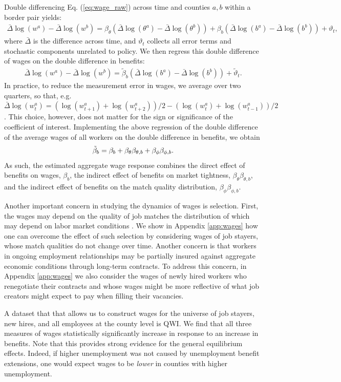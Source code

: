 \documentclass[12pt]{article}
\newcommand{\1}{\mathbf{1}}
\newcommand{\beq}{\begin{eqnarray}}
\newcommand{\eeq}{\end{eqnarray}}
\begin{document}
Double differencing Eq. (\ref{eq:wage_raw}) across time and counties $a,b$ within a border pair yields:
\beq \label{eq:wage_thetab}
\bar{\Delta} \log(w^a) - \bar{\Delta} \log(w^b)
=  \beta_{\theta} (\bar{\Delta} \log(\theta^a) - \bar{\Delta}\log(\theta^b))
+ \beta_b (\bar{\Delta}\log(b^a) - \bar{\Delta}\log(b^b)) + \vartheta_t,
\eeq
where $\bar{\Delta}$ is the difference across time, and $\vartheta_t$ collects all error terms and stochastic components unrelated to policy. We then regress this double difference of wages on the double difference in benefits:
\beq \label{eq:wageequation_estimate}
\bar{\Delta}\log(w^a) - \bar{\Delta}\log(w^b)
=\tilde{\beta}_b (\bar{\Delta}\log(b^a) - \bar{\Delta}\log(b^b)) + \tilde{\vartheta}_t.
\eeq
In practice, to reduce the measurement error in wages, we average over two quarters, so that, e.g. $\bar{\Delta}\log(w^a_t) = (\log (w_{t+1}^a)+\log (w_{t+2}^a))/2 - (\log (w_{t}^a)+\log (w_{t-1}^a))/2$. This choice, however, does not matter for the sign or significance of the coefficient of interest.  Implementing the above regression of the double difference of the average wages of all workers on the double difference in benefits, we obtain
\beq
\tilde{\beta}_b = \beta_b + \beta_{\theta} \beta_{\theta,b} + \beta_{\phi} \beta_{\phi,b}. \notag
\eeq
As such, the estimated aggregate wage response combines the direct effect of benefits on wages, $\beta_b$, the indirect effect of benefits on market tightness, $\beta_{\theta} \beta_{\theta,b}$, and the indirect effect of benefits on the match quality distribution, $\beta_{\phi} \beta_{\phi,b}$.

Another important concern in studying the dynamics of wages is selection. First, the wages may depend on the quality of job matches the distribution of which may depend on labor market conditions \citep{gertler+trigari:09, hagedorn+manovskii:13}. We show in Appendix \ref{app:wages} how one can overcome the effect of such selection by considering wages of job stayers, whose match qualities do not change over time. Another concern is that workers in ongoing employment relationships may be partially insured against aggregate economic conditions through long-term contracts. To address this concern, in Appendix \ref{app:wages} we also consider the wages of newly hired workers who renegotiate their contracts and whose wages might be more reflective of what job creators might expect to pay when filling their vacancies. 

A dataset that that allows us to construct wages for the universe of job stayers, new hires, and all employees at the county level is QWI. We find that all three measures of wages statistically significantly increase in response to an increase in benefits. Note that this provides strong evidence for the general equilibrium effects. Indeed, if higher unemployment was not caused by unemployment benefit extensions, one would expect wages to be \emph{lower} in counties with higher unemployment.
\end{document}
